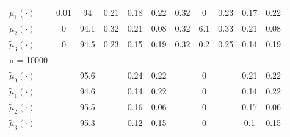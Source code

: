 \begin{table}[H]
\begin{center}
\begin{tabular}{l@{\hskip 1em}c@{\hskip 1em}c@{\hskip 1em}c@{\hskip 1em}c@{\hskip 1em}c@{\hskip 1em}c@{\hskip 1em}c@{\hskip 1em}c@{\hskip 1em}c@{\hskip 1em}c}
 $\tilde{\mu}_{1}(\cdot)$\vphantom{2500}  &   0.01 &       94   &     0.21 &         0.18 &         0.22 &               0.32 &                    0   &                 0.23 &                     0.17 &                     0.22 \\
 $\tilde{\mu}_{2}(\cdot)$\vphantom{2500}  &   0    &       94.1 &     0.32 &         0.21 &         0.08 &               0.32 &                    6.1 &                 0.33 &                     0.21 &                     0.08 \\
 $\tilde{\mu}_{3}(\cdot)$\vphantom{2500}  &   0    &       94.5 &     0.23 &         0.15 &         0.19 &               0.32 &                    0.2 &                 0.25 &                     0.14 &                     0.19 \\
 n = 10000                                &     &         &       &           &           &                 &                     &                   &                       &                       \\
 $\tilde{\mu}_{0}(\cdot)$\vphantom{10000} &     &       95.6 &       &         0.24 &         0.22 &                 &                    0   &                   &                     0.21 &                     0.22 \\
 $\tilde{\mu}_{1}(\cdot)$\vphantom{10000} &     &       94.6 &       &         0.14 &         0.22 &                 &                    0   &                   &                     0.14 &                     0.22 \\
 $\tilde{\mu}_{2}(\cdot)$\vphantom{10000} &     &       95.5 &       &         0.16 &         0.06 &                 &                    0   &                   &                     0.17 &                     0.06 \\
 $\tilde{\mu}_{3}(\cdot)$\vphantom{10000} &     &       95.3 &       &         0.12 &         0.15 &                 &                    0   &                   &                     0.1  &                     0.15 \\
\hline
\end{tabular}
\end{center}
\medskip
\end{table}
